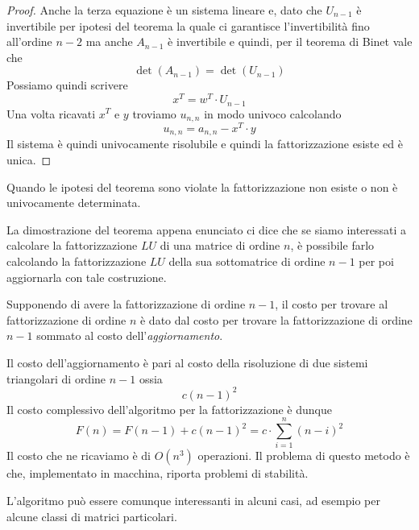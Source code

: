\begin{theorem}
\begin{proof}
		Anche la terza equazione è un sistema lineare e, dato che $U_{n-1}$ è invertibile per ipotesi del teorema
		la quale ci garantisce l'invertibilità fino all'ordine $n-2$ ma anche $A_{n-1}$ è invertibile e quindi,
		per il teorema di Binet vale che
		\[ \det(A_{n-1}) = \det(U_{n-1}) \]
		Possiamo quindi scrivere
		\[ x^T = w^T \cdot U_{n-1} \]
		Una volta ricavati $x^T$ e $y$ troviamo $u_{n,n}$ in modo univoco calcolando
		\[ u_{n,n} = a_{n,n} - x^T \cdot y \]
		Il sistema è quindi univocamente risolubile e quindi la fattorizzazione esiste ed è unica.
	\end{proof}
	Quando le ipotesi del teorema sono violate la fattorizzazione non esiste o non è univocamente determinata.
\end{theorem}

La dimostrazione del teorema appena enunciato ci dice che se siamo interessati a calcolare la fattorizzazione
$LU$ di una matrice di ordine $n$, è possibile farlo calcolando la fattorizzazione $LU$ della sua sottomatrice
di ordine $n-1$ per poi aggiornarla con tale costruzione.

Supponendo di avere la fattorizzazione di ordine $n-1$, il costo per trovare al fattorizzazione di ordine $n$
è dato dal costo per trovare la fattorizzazione di ordine $n-1$ sommato al costo dell'\emph{aggiornamento}.

Il costo dell'aggiornamento è pari al costo della risoluzione di due sistemi triangolari di ordine $n-1$ ossia
\[ c (n - 1)^2 \]
Il costo complessivo dell'algoritmo per la fattorizzazione è dunque
\[ F(n) = F(n-1) + c (n-1)^2 = c \cdot \sum_{i=1}^{n} (n - i)^2 \]
Il costo che ne ricaviamo è di $O(n^3)$ operazioni. Il problema di questo metodo è che, implementato in macchina,
riporta problemi di stabilità.

L'algoritmo può essere comunque interessanti in alcuni casi, ad esempio per alcune classi di matrici particolari.

